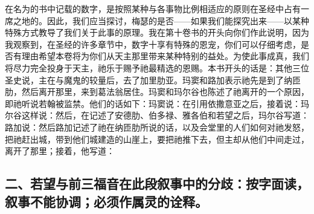 在名为的书中记载的数字，是按照某种与各事物比例相适应的原则在圣经中占有一席之地的。因此，我们应当探讨，梅瑟的是否——如果我们能探究出来——以某种特殊方式教导了我们关于此事的原理。我在第十卷书的开头向你们作此说明，因为我观察到，在圣经的许多章节中，数字十享有特殊的恩宠，你们可以仔细考虑，是否有理由希望本卷将为你们从天主那里带来某种特别的益处。为使此事成真，我们将尽力完全投身于天主，祂乐于赐予祂最精选的恩赐。本书开头的话是：其他三位圣史说，主在与魔鬼的较量后，去了加里肋亚。玛窦和路加表示祂先是到了纳匝肋，然后离开那里，来到葛法翁居住。玛窦和玛尔谷也陈述了祂离开的一个原因，即祂听说若翰被监禁。他们的话如下：玛窦说：在引用依撒意亚之后，接着说：玛尔谷这样说：然后，在记述了安德肋、伯多禄、雅各伯和若望之后，玛尔谷写道：路加说：然后路加记述了祂在纳匝肋所说的话，以及会堂里的人们如何对祂发怒，把祂赶出城，带到他们城建造的山崖上，要把祂推下去，但主却从他们中间走过，离开了那里；接着，他写道：\par


\subsection{二、若望与前三福音在此段叙事中的分歧：按字面读，叙事不能协调；必须作属灵的诠释。}

